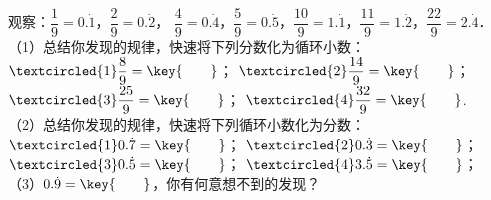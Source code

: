 观察：$\dfrac{1}{9}=0.\dot{1}$，$\dfrac{2}{9}=0.\dot{2}$，
$\dfrac{4}{9}=0.\dot{4}$，$\dfrac{5}{9}=0.\dot{5}$，$\dfrac{10}{9}=1.\dot{1}$，$\dfrac{11}{9}=1.\dot{2}$，$\dfrac{22}{9}=2.\dot{4}$．\\
（1）总结你发现的规律，快速将下列分数化为循环小数：\\
$\textcircled{1}\dfrac{8}{9}=\key{\qquad}$；
$\textcircled{2}\dfrac{14}{9}=\key{\qquad}$；
$\textcircled{3}\dfrac{25}{9}=\key{\qquad}$；
$\textcircled{4}\dfrac{32}{9}=\key{\qquad}$.\\
（2）总结你发现的规律，快速将下列循环小数化为分数：\\
$\textcircled{1}0.\dot{7}=\key{\qquad}$；
$\textcircled{2}0.\dot{3}=\key{\qquad}$；
$\textcircled{3}0.\dot{5}=\key{\qquad}$；
$\textcircled{4}3.\dot{5}=\key{\qquad}$；\\
（3）$0.\dot{9}=\key{\qquad}$，你有何意想不到的发现？